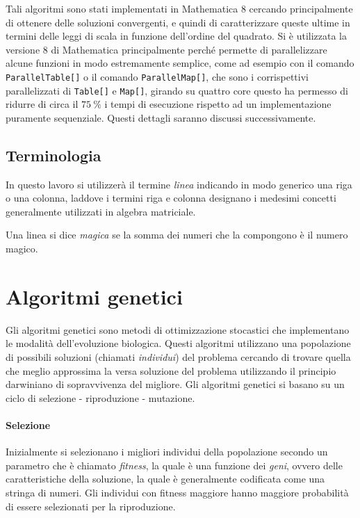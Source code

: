 \documentclass[italian,twoside,twocolumn]{article}
\begin{document}
Tali algoritmi sono stati implementati in Mathematica 8 cercando principalmente di ottenere delle soluzioni convergenti, e quindi di caratterizzare queste ultime in termini delle leggi di scala in funzione dell'ordine del quadrato. Si è utilizzata la versione 8 di Mathematica principalmente perché permette di parallelizzare alcune funzioni in modo estremamente semplice, come ad esempio con il comando \texttt{ParallelTable[]} o il comando \texttt{ParallelMap[]}, che sono i corrispettivi parallelizzati di \texttt{Table[]} e \texttt{Map[]}, girando su quattro core questo ha permesso di ridurre di circa il $ \SI{75}{\percent} $ i tempi di esecuzione rispetto ad un implementazione puramente sequenziale. Questi dettagli saranno discussi successivamente.

\subsection{Terminologia}

In questo lavoro si utilizzerà il termine \emph{linea} indicando in modo generico una riga o una colonna, laddove i termini riga e colonna designano i medesimi concetti generalmente utilizzati in algebra matriciale. 

Una linea si dice \emph{magica} se la somma dei numeri che la compongono è il numero magico.

\section{Algoritmi genetici}
Gli algoritmi genetici sono metodi di ottimizzazione stocastici che implementano le modalità dell'evoluzione biologica. Questi algoritmi utilizzano una popolazione di possibili soluzioni (chiamati \emph{individui}) del problema cercando di trovare quella che meglio approssima la versa soluzione del problema utilizzando il principio darwiniano di sopravvivenza del migliore. Gli algoritmi genetici si basano su un ciclo di selezione - riproduzione - mutazione.
\paragraph{Selezione} Inizialmente si selezionano i migliori individui della popolazione secondo un parametro che è chiamato \emph{fitness}, la quale è una funzione dei \emph{geni}, ovvero delle caratteristiche della soluzione, la quale è generalmente codificata come una stringa di numeri. Gli individui con fitness maggiore hanno maggiore probabilità di essere selezionati per la riproduzione.
\end{document}
